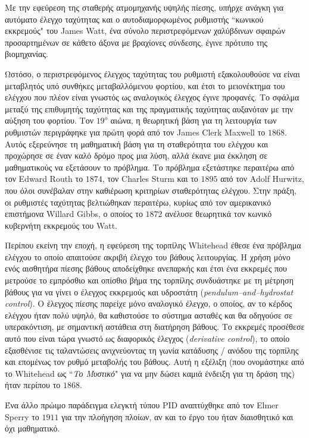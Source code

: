 Με την εφεύρεση της σταθερής ατμομηχανής υψηλής πίεσης, υπήρχε ανάγκη για αυτόματο έλεγχο ταχύτητας και ο αυτοδιαμορφωμένος ρυθμιστής ``κωνικού εκκρεμούς" του James Watt, ένα σύνολο περιστρεφόμενων χαλύβδινων σφαιρών προσαρτημένων σε κάθετο άξονα με βραχίονες σύνδεσης, έγινε πρότυπο της βιομηχανίας.

Ωστόσο, ο περιστρεφόμενος έλεγχος ταχύτητας του ρυθμιστή εξακολουθούσε να είναι μεταβλητός υπό συνθήκες μεταβαλλόμενου φορτίου, και έτσι το μειονέκτημα του ελέγχου που πλέον είναι γνωστός ως αναλογικός έλεγχος έγινε προφανές. Το σφάλμα μεταξύ της επιθυμητής ταχύτητας και της πραγματικής ταχύτητας αυξανόταν με την αύξηση του φορτίου. Τον $19^o$ αιώνα, η θεωρητική βάση για τη λειτουργία των ρυθμιστών περιγράφηκε για πρώτη φορά από τον James Clerk Maxwell το $1868$. Αυτός εξερεύνησε τη μαθηματική βάση για τη σταθερότητα του ελέγχου και προχώρησε σε έναν καλό δρόμο προς μια λύση, αλλά έκανε μια έκκληση σε μαθηματικούς να εξετάσουν το πρόβλημα.
Το πρόβλημα εξετάστηκε περαιτέρω από τον Edward Routh το $1874$, τον Charles Sturm και το $1895$ από τον Adolf Hurwitz, που όλοι συνέβαλαν στην καθιέρωση κριτηρίων σταθερότητας ελέγχου.
Στην πράξη, οι ρυθμιστές ταχύτητας βελτιώθηκαν περαιτέρω, κυρίως από τον αμερικανικό επιστήμονα Willard Gibbs, ο οποίος το $1872$ ανέλυσε θεωρητικά τον κωνικό κυβερνήτη εκκρεμούς του Watt.

Περίπου εκείνη την εποχή, η εφεύρεση της τορπίλης Whitehead έθεσε ένα πρόβλημα ελέγχου το οποίο απαιτούσε ακριβή έλεγχο του βάθους λειτουργίας. Η χρήση μόνο ενός αισθητήρα πίεσης βάθους αποδείχθηκε ανεπαρκής και έτσι ένα εκκρεμές που μετρούσε το εμπρόσθιο και οπίσθιο βήμα της τορπίλης συνδυάστηκε με τη μέτρηση βάθους για να γίνει ο έλεγχος εκκρεμούς και υδροστάτη (\emph{pendulum--and--hydrostat control}). Ο έλεγχος πίεσης παρείχε μόνο αναλογικό έλεγχο, ο οποίος, αν το κέρδος ελέγχου ήταν πολύ υψηλό, θα καθιστούσε το σύστημα ασταθές και θα οδηγούσε σε υπερακόντιση, με σημαντική αστάθεια στη διατήρηση βάθους. Το εκκρεμές προσέθεσε αυτό που είναι τώρα γνωστό ως διαφορικός έλεγχος (\emph{derivative control}), το οποίο εξασθένισε τις ταλαντώσεις ανιχνεύοντας τη γωνία κατάδυσης / ανόδου της τορπίλης και επομένως τον ρυθμό μεταβολής του βάθους.
Αυτή η εξέλιξη (που ονομάστηκε από το Whitehead ως ``\emph{Το Μυστικό}" για να μην δώσει καμιά ένδειξη για τη δράση της) ήταν περίπου το $1868$.%

Ένα άλλο πρώιμο παράδειγμα ελεγκτή τύπου PID αναπτύχθηκε από τον Elmer Sperry το $1911$ για την πλοήγηση πλοίων, αν και το έργο του ήταν διαισθητικό και όχι μαθηματικό.%

